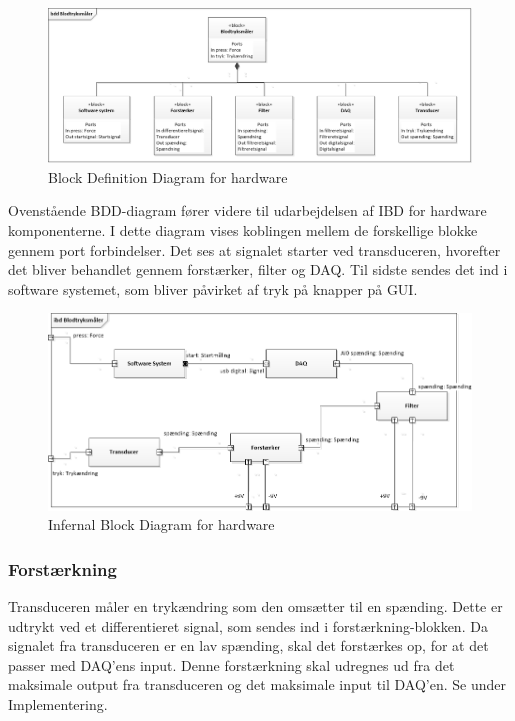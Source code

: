 \begin{figure}[H]
	\centering
	\includegraphics[width=1.0\textwidth]{Figurer/BDD}
	\caption{Block Definition Diagram for hardware}
\end{figure}

Ovenstående BDD-diagram fører videre til udarbejdelsen af IBD for hardware komponenterne. I dette diagram vises koblingen mellem de forskellige blokke gennem port forbindelser.  Det ses at signalet starter ved transduceren, hvorefter det bliver behandlet gennem forstærker, filter og DAQ. Til sidste sendes det ind i software systemet, som bliver påvirket af tryk på knapper på GUI. 

\begin{figure}[H]
	\centering
	\includegraphics[width=1.0\textwidth]{Figurer/IBD}
	\caption{Infernal Block Diagram for hardware}
	\label{fig:IBD viser koblingen mellem blodtrykssystemets hardwaredele}
\end{figure}

\subsubsection{Forstærkning}
Transduceren måler en trykændring som den omsætter til en spænding. Dette er udtrykt ved et differentieret signal, som sendes ind i forstærkning-blokken. Da signalet fra transduceren er en lav spænding, skal det forstærkes op, for at det passer med DAQ'ens input. Denne forstærkning skal udregnes ud fra det maksimale output fra transduceren og det maksimale input til DAQ'en. Se under Implementering.  

